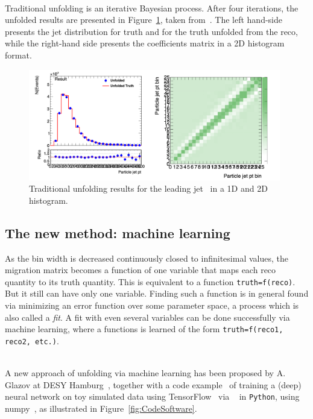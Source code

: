 \ \\Traditional unfolding is an iterative Bayesian process. After four iterations, the unfolded results are presented in Figure~\ref{fig:2DMigrationMatrix}, taken from~\cite{ReportYichenLi}. The left hand-side presents the jet distribution for truth and for the truth unfolded from the reco, while the right-hand side presents the coefficients matrix in a 2D histogram format.

\begin{figure}[h]
  \centering
  \includegraphics[width=0.98\textwidth]{./plots/TraditionalUnfoldingResults.png}
  \caption{Traditional unfolding results for the leading jet \pt~in a 1D and 2D histogram.}
  \label{fig:2DMigrationMatrix}
\end{figure}

\subsection{The new method: machine learning}
\label{sec:UnfoldingMachine Learning}

As the bin width is decreased continuously closed to infinitesimal values, the migration matrix becomes a function of one variable that maps each reco quantity to its truth quantity. This is equivalent to a function \texttt{truth=f(reco)}. But it still can have only one variable. Finding such a function is in general found via minimizing an error function over some parameter space, a process which is also called a \emph{fit}. A fit with even several variables can be done successfully via machine learning, where a functions is learned of the form \texttt{truth=f(reco1, reco2, etc.)}. 

\ \\A new approach of unfolding via machine learning has been proposed by A. Glazov at DESY Hamburg~\cite{AGlazov}, together with a code example~\cite{AGlazovCode} of training a (deep) neural network on toy simulated data using TensorFlow~\cite{TensorFlow} via ~\cite{Keras} in \texttt{Python}, using numpy~\cite{numpy}, as illustrated in Figure~\ref{fig:CodeSoftware}. 

